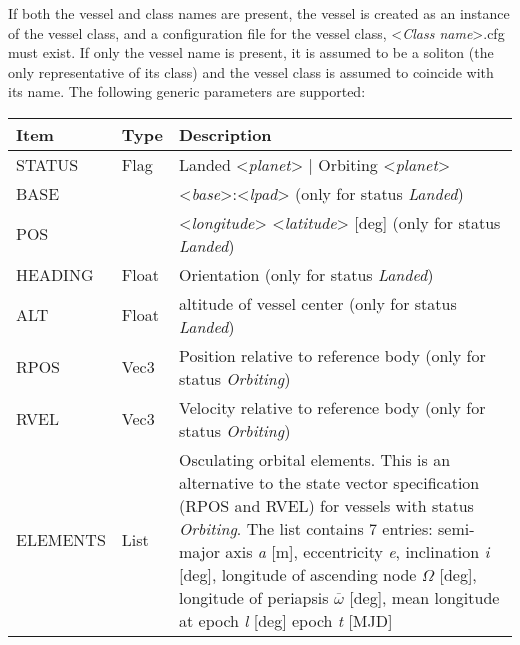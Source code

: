 \documentclass[Orbiter Developer Manual.tex]{subfiles}
\begin{document}
\noindent
If both the vessel and class names are present, the vessel is created as an instance of the vessel class, and a configuration file for the vessel class, <\textit{Class name}>.cfg must exist. If only the vessel name is present, it is assumed to be a soliton (the only representative of its class) and the vessel class is assumed to coincide with its name.
The following generic parameters are supported:

	\begin{longtable}{ |p{}|p{}|p{}| }
	\hline\rule{0pt}{2ex}
	\textbf{Item} & \textbf{Type} & \textbf{Description}\\
	\hline\rule{0pt}{2ex}
	STATUS & Flag & Landed <\textit{planet}> | Orbiting <\textit{planet}>\\
	\hline\rule{0pt}{2ex}
	BASE &  & <\textit{base}>:<\textit{lpad}> (only for status \textit{Landed})\\
	\hline\rule{0pt}{2ex}
	POS &  & <\textit{longitude}> <\textit{latitude}> [deg] (only for status \textit{Landed})\\
	\hline\rule{0pt}{2ex}
	HEADING & Float & Orientation (only for status \textit{Landed})\\
	\hline\rule{0pt}{2ex}
	ALT & Float & altitude of vessel center (only for status \textit{Landed})\\
	\hline\rule{0pt}{2ex}
	RPOS & Vec3 & Position relative to reference body (only for status \textit{Orbiting})\\
	\hline\rule{0pt}{2ex}
	RVEL & Vec3 & Velocity relative to reference body (only for status \textit{Orbiting})\\
	\hline\rule{0pt}{2ex}
	ELEMENTS & List & Osculating orbital elements. This is an alternative to the state vector specification (RPOS and RVEL) for vessels with status \textit{Orbiting}. The list contains 7 entries:\newline
	semi-major axis \textit{a} [m],\newline
	eccentricity \textit{e},\newline
	inclination \textit{i} [deg],\newline
	longitude of ascending node $\Omega$ [deg],\newline
	longitude of periapsis $\overline{\omega}$ [deg],\newline
	mean longitude at epoch \textit{l} [deg]\newline
	epoch \textit{t} [MJD]\\

\end{longtable}
\end{document}
